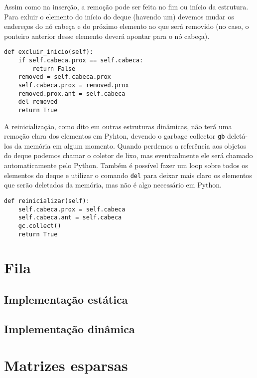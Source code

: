 \documentclass[a4paper, twocolumn]{article}
\theoremstyle{definition}
\begin{document}
Assim como na inserção, a remoção pode ser feita no fim ou início da estrutura. Para exluir o elemento do início do deque (havendo um) devemos mudar os endereços do nó cabeça e do próximo elemento ao que será removido (no caso, o ponteiro anterior desse elemento deverá apontar para o nó cabeça).
\begin{lstlisting}[label=deque_excluir, caption= Deque (remoção no início)]
def excluir_inicio(self):
    if self.cabeca.prox == self.cabeca: 
    	return False
    removed = self.cabeca.prox
    self.cabeca.prox = removed.prox
    removed.prox.ant = self.cabeca
    del removed
    return True
\end{lstlisting}

A reinicialização, como dito em outras estruturas dinâmicas, não terá uma remoção clara dos elementos em Pyhton, devendo o garbage collector \texttt{gb} deletá-los da memória em algum momento. Quando perdemos a referência aos objetos do deque podemos chamar o coletor de lixo, mas eventualmente ele será chamado automaticamente pelo Python. Também é possível fazer um loop sobre todos os elementos do deque e utilizar o comando \texttt{del} para deixar mais claro os elementos que serão deletados da memória, mas não é algo necessário em Python.
\begin{lstlisting}[label=deque_reinicializar, caption= Deque (reinicialização)]
def reinicializar(self):
    self.cabeca.prox = self.cabeca
    self.cabeca.ant = self.cabeca
    gc.collect()
    return True
\end{lstlisting}

\section{Fila}

\subsection{Implementação estática}

\subsection{Implementação dinâmica}

\section{Matrizes esparsas}
\end{document}
